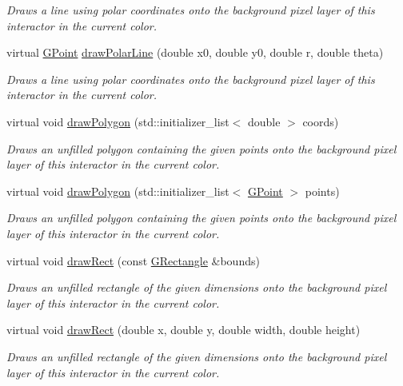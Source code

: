 \begin{DoxyCompactItemize}
\begin{DoxyCompactList}\small\item\em Draws a line using polar coordinates onto the background pixel layer of this interactor in the current color. \end{DoxyCompactList}\item 
virtual \mbox{\hyperlink{classGPoint}{G\+Point}} \mbox{\hyperlink{classGDrawingSurface_ad3e646f90005295f2bbdf37d2bcb39d2}{draw\+Polar\+Line}} (double x0, double y0, double r, double theta)
\begin{DoxyCompactList}\small\item\em Draws a line using polar coordinates onto the background pixel layer of this interactor in the current color. \end{DoxyCompactList}\item 
virtual void \mbox{\hyperlink{classGDrawingSurface_afddec0a905108d8a8d6809a157f26776}{draw\+Polygon}} (std\+::initializer\+\_\+list$<$ double $>$ coords)
\begin{DoxyCompactList}\small\item\em Draws an unfilled polygon containing the given points onto the background pixel layer of this interactor in the current color. \end{DoxyCompactList}\item 
virtual void \mbox{\hyperlink{classGDrawingSurface_a021ee881e0d154dc4dd059698742889c}{draw\+Polygon}} (std\+::initializer\+\_\+list$<$ \mbox{\hyperlink{classGPoint}{G\+Point}} $>$ points)
\begin{DoxyCompactList}\small\item\em Draws an unfilled polygon containing the given points onto the background pixel layer of this interactor in the current color. \end{DoxyCompactList}\item 
virtual void \mbox{\hyperlink{classGDrawingSurface_a3dd4cc5891149dfc36746264f7289877}{draw\+Rect}} (const \mbox{\hyperlink{classGRectangle}{G\+Rectangle}} \&bounds)
\begin{DoxyCompactList}\small\item\em Draws an unfilled rectangle of the given dimensions onto the background pixel layer of this interactor in the current color. \end{DoxyCompactList}\item 
virtual void \mbox{\hyperlink{classGDrawingSurface_a4148e770ffc5474153aadd4814dbd708}{draw\+Rect}} (double x, double y, double width, double height)
\begin{DoxyCompactList}\small\item\em Draws an unfilled rectangle of the given dimensions onto the background pixel layer of this interactor in the current color. \end{DoxyCompactList}\item 

\end{DoxyCompactItemize}
